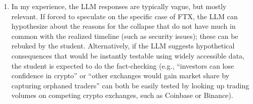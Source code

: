 \documentclass[a4paper]{article}
\begin{document}
\begin{enumerate}
	
	\item In my experience, the LLM responses are typically vague, but mostly relevant. If forced to speculate on the specific case of FTX, the LLM can hypothesize about the reasons for the collapse that do not have much in common with the realized timeline (such as security issues); these can be rebuked by the student.
	Alternatively, if the LLM suggests hypothetical consequences that would be instantly testable using widely accessible data, the student is expected to do the fact-checking (e.g., ``investors can lose confidence in crypto'' or ``other exchanges would gain market share by capturing orphaned traders'' can both be easily tested by looking up trading volumes on competing crypto exchanges, such as Coinbase or Binance).
	

\end{enumerate}
\end{document}
